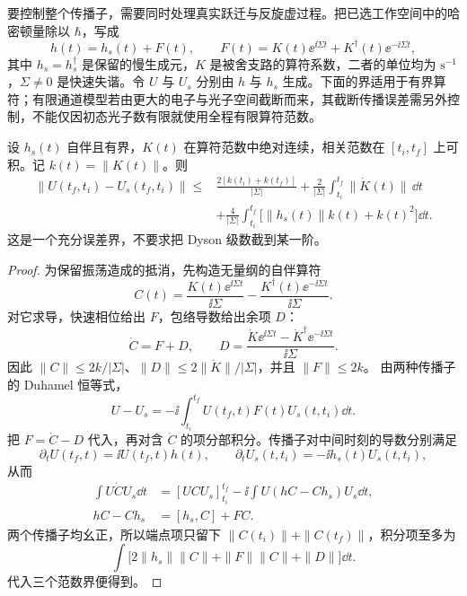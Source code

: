 要控制整个传播子，需要同时处理真实跃迁与反旋虚过程。把已选工作空间中的哈密顿量除以 $\hbar$，写成
\[
 h(t)=h_s(t)+F(t),\qquad
 F(t)=K(t)\ee^{\ii\Sigma t}+K^\dagger(t)\ee^{-\ii\Sigma t},
\]
其中 $h_s=h_s^\dagger$ 是保留的慢生成元，$K$ 是被舍支路的算符系数，二者的单位均为 $\mathrm{s^{-1}}$，$\Sigma\ne0$ 是快速失谐。令 $U$ 与 $U_s$ 分别由 $h$ 与 $h_s$ 生成。下面的界适用于有界算符；有限通道模型若由更大的电子与光子空间截断而来，其截断传播误差需另外控制，不能仅因初态光子数有限就使用全程有限算符范数。

\begin{proposition}[快速支路的有限时间传播界]
设 $h_s(t)$ 自伴且有界，$K(t)$ 在算符范数中绝对连续，相关范数在 $[t_i,t_f]$ 上可积。记 $k(t)=\|K(t)\|$。则
\begin{equation}
\begin{aligned}
 \|U(t_f,t_i)-U_s(t_f,t_i)\|
 \le{}&\frac{2[k(t_i)+k(t_f)]}{|\Sigma|}
 +\frac{2}{|\Sigma|}\int_{t_i}^{t_f}\|\dot K(t)\|\,\dd t\\
 &+\frac{4}{|\Sigma|}\int_{t_i}^{t_f}
 \bigl[\|h_s(t)\|k(t)+k(t)^2\bigr]\dd t .
\end{aligned}
\label{eq:feqo-fast-branch-propagator-bound}
\end{equation}
这是一个充分误差界，不要求把 Dyson 级数截到某一阶。
\end{proposition}
\begin{proof}
为保留振荡造成的抵消，先构造无量纲的自伴算符
\[
 C(t)=\frac{K(t)\ee^{\ii\Sigma t}}{\ii\Sigma}
       -\frac{K^\dagger(t)\ee^{-\ii\Sigma t}}{\ii\Sigma}.
\]
对它求导，快速相位给出 $F$，包络导数给出余项 $D$：
\[
 \dot C=F+D,\qquad
 D=\frac{\dot K\ee^{\ii\Sigma t}
          -\dot K^\dagger\ee^{-\ii\Sigma t}}{\ii\Sigma}.
\]
因此 $\|C\|\le2k/|\Sigma|$、$\|D\|\le2\|\dot K\|/|\Sigma|$，并且 $\|F\|\le2k$。
由两种传播子的 Duhamel 恒等式，
\[
 U-U_s=-\ii\int_{t_i}^{t_f}U(t_f,t)F(t)U_s(t,t_i)\dd t.
\]
把 $F=\dot C-D$ 代入，再对含 $\dot C$ 的项分部积分。传播子对中间时刻的导数分别满足
\[
 \partial_tU(t_f,t)=\ii U(t_f,t)h(t),\qquad
 \partial_tU_s(t,t_i)=-\ii h_s(t)U_s(t,t_i),
\]
从而
\begin{align*}
 \int U\dot C U_s\dd t
 &=[UCU_s]_{t_i}^{t_f}
   -\ii\int U(hC-Ch_s)U_s\dd t,\\
 hC-Ch_s&=[h_s,C]+FC.
\end{align*}
两个传播子均幺正，所以端点项只留下 $\|C(t_i)\|+\|C(t_f)\|$，积分项至多为
\[
 \int\bigl[2\|h_s\|\|C\|+\|F\|\|C\|+\|D\|\bigr]\dd t.
\]
代入三个范数界便得到。
\end{proof}

